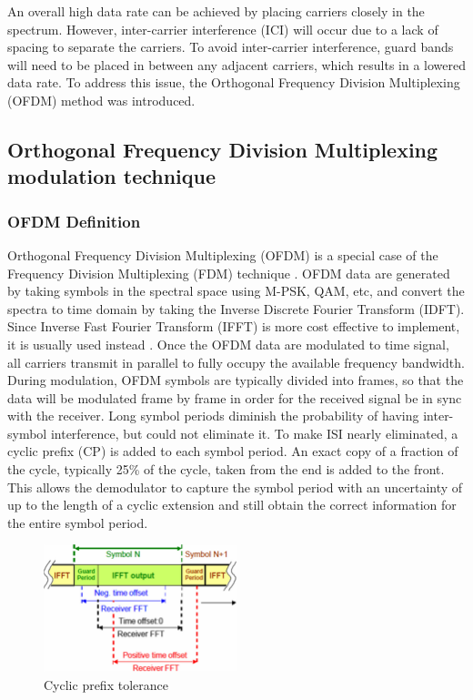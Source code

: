 An overall high data rate can be achieved by placing carriers closely in the spectrum. However, inter-carrier interference (ICI) will occur due to a lack of spacing to separate the carriers. To avoid inter-carrier interference, guard bands will need to be placed in between any adjacent carriers, which results in a lowered data rate. To address this issue, the 
Orthogonal Frequency Division Multiplexing (OFDM) method was introduced.

\subsection{Orthogonal Frequency Division Multiplexing modulation technique}
\subsubsection{OFDM Definition}

Orthogonal Frequency Division Multiplexing (OFDM) is a special case of the Frequency Division Multiplexing (FDM) technique \cite{OFDM2010}.
OFDM data are generated by taking symbols in the spectral space using M-PSK, QAM, etc, and convert the spectra to time domain by taking the Inverse Discrete Fourier Transform (IDFT). Since Inverse Fast Fourier Transform (IFFT) is more cost effective to implement, it is usually used instead \cite{b3}. Once the OFDM data are modulated to time signal, all carriers transmit in parallel to fully occupy the available frequency bandwidth. During modulation, OFDM symbols are typically divided into frames, so that the data will be modulated frame by frame in order for the received signal be in sync with the receiver. Long symbol periods diminish the probability of having inter-symbol interference, but could not eliminate it. To make ISI nearly eliminated, a cyclic prefix (CP) is added to each symbol period. An exact copy of a fraction of the cycle, typically 25\% of the cycle, taken from the end is added to the front. This allows the demodulator to capture the symbol period with an uncertainty of up to the length of a cyclic extension and still obtain the correct information for the entire symbol period.

\begin{figure}[ht]
    \centering
    \includegraphics[width=0.5\textwidth]{Figures/Cyclic-extension-tolerance}
    \caption{Cyclic prefix tolerance}
    \label{Cyclic-extension-tolerance}
\end{figure}

